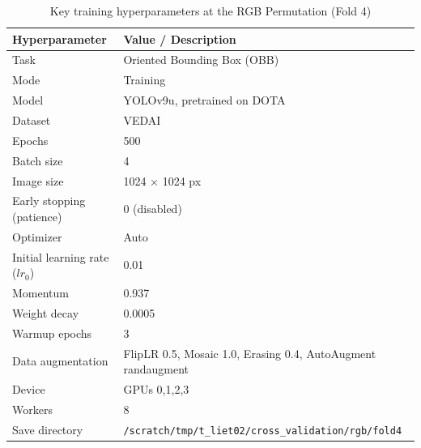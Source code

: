 \begin{table}[htbp]
\centering

\begin{tabular}{ll}
\hline
\textbf{Hyperparameter} & \textbf{Value / Description} \\
\hline
Task & Oriented Bounding Box (OBB) \\
Mode & Training \\
Model & YOLOv9u, pretrained on \acrshort{DOTA} \\
Dataset & \acrshort{VEDAI}  \\
Epochs & 500 \\
Batch size & 4 \\
Image size & 1024 × 1024 px \\
Early stopping (patience) & 0 (disabled) \\
Optimizer & Auto \\
Initial learning rate ($lr_0$) & 0.01 \\
Momentum & 0.937 \\
Weight decay & 0.0005 \\
Warmup epochs & 3 \\
Data augmentation & FlipLR 0.5, Mosaic 1.0, Erasing 0.4, AutoAugment randaugment \\
Device & GPUs 0,1,2,3 \\
Workers & 8 \\
Save directory & \texttt{/scratch/tmp/t\_liet02/cross\_validation/rgb/fold4} \\
\hline
\end{tabular}
\caption{Key training hyperparameters at the \acrshort{RGB} Permutation (Fold 4)}
\label{tab:hyperparameters}
\end{table}



